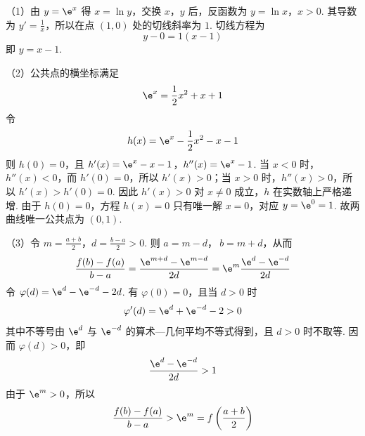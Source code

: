 \begin{solution}
（1）由 \(y=\e^x\) 得 \(x=\ln y\)，交换 \(x\)，\(y\) 后，反函数为
\(y=\ln x\)，\(x>0\).
其导数为 \(y'=\frac1x\)，所以在点 \((1,0)\) 处的切线斜率为 \(1\). 切线方程为
\[
y-0=1(x-1)
\]
即 \(y=x-1\).

（2）公共点的横坐标满足
\[
\e^x=\frac12x^2+x+1
\]
令
\[
h(x)=\e^x-\frac12x^2-x-1
\]
则 \(h(0)=0\)，且
\(h'(x)=\e^x-x-1\)，\(h''(x)=\e^x-1\).
当 \(x<0\) 时，\(h''(x)<0\)，而 \(h'(0)=0\)，所以 \(h'(x)>0\)；当 \(x>0\) 时，\(h''(x)>0\)，所以 \(h'(x)>h'(0)=0\). 因此 \(h'(x)>0\) 对 \(x\ne0\) 成立，\(h\) 在实数轴上严格递增. 由于 \(h(0)=0\)，方程 \(h(x)=0\) 只有唯一解 \(x=0\)，对应 \(y=\e^0=1\). 故两曲线唯一公共点为 \((0,1)\).

（3）令
\(m=\frac{a+b}{2}\)，\(d=\frac{b-a}{2}>0\).
则 \(a=m-d\)，\(\ b=m+d\)，从而
\[
\frac{f(b)-f(a)}{b-a}
=\frac{\e^{m+d}-\e^{m-d}}{2d}
=\e^m\frac{\e^d-\e^{-d}}{2d}
\]
令 \(\varphi(d)=\e^d-\e^{-d}-2d\). 有 \(\varphi(0)=0\)，且当 \(d>0\) 时
\[
\varphi'(d)=\e^d+\e^{-d}-2>0
\]
其中不等号由 \(\e^d\) 与 \(\e^{-d}\) 的算术—几何平均不等式得到，且 \(d>0\) 时不取等. 因而 \(\varphi(d)>0\)，即
\[
\frac{\e^d-\e^{-d}}{2d}>1
\]
由于 \(\e^m>0\)，所以
\[
\frac{f(b)-f(a)}{b-a}>\e^m
=f\left(\frac{a+b}{2}\right)
\]
\end{solution}
